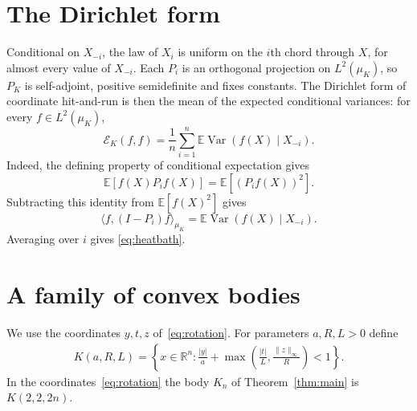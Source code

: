 \documentclass[11pt]{amsart}
\theoremstyle{remark}
\numberwithin{equation}{section}
\newcommand{\E}{\mathbb E}
\newcommand{\R}{\mathbb R}
\newcommand{\Var}{\operatorname{Var}}
\begin{document}
\section{The Dirichlet form}\label{sec:operator}
Conditional on $X_{-i}$, the law of $X_i$ is uniform on the $i$th chord
through $X$, for almost every value of $X_{-i}$. Each $P_i$ is an orthogonal
projection on $L^2(\mu_K)$, so $P_K$ is self-adjoint, positive
semidefinite and fixes constants. The Dirichlet form of coordinate
hit-and-run is then the mean of the expected conditional variances: for
every $f\in L^2(\mu_K)$,
\begin{equation}\label{eq:heatbath}
 \mathcal E_K(f,f)=\frac1n\sum_{i=1}^n
 \E\Var(f(X)\mid X_{-i}).
\end{equation}
Indeed, the defining property of conditional expectation gives
\[
 \E[f(X)P_i f(X)]=\E[(P_i f(X))^2].
\]
Subtracting this identity from $\E[f(X)^2]$ gives
\[
 \langle f,(I-P_i)f\rangle_{\mu_K}
 =\E\Var(f(X)\mid X_{-i}).
\]
Averaging over $i$ gives \eqref{eq:heatbath}.

\section{A family of convex bodies}\label{sec:geometry}
We use the coordinates $y,t,z$ of~\eqref{eq:rotation}. For parameters $a,R,L>0$ define
\begin{equation}\label{eq:body}
 \begin{gathered}
 K(a,R,L)=\left\{x\in\R^n:
 \frac{|y|}{a}+\max\left(\frac{|t|}{L},\frac{\|z\|_\infty}{R}\right)<1
 \right\}.
 \end{gathered}
\end{equation}
In the coordinates~\eqref{eq:rotation} the body $K_n$ of Theorem~\ref{thm:main} is $K(2,2,2n)$.
\end{document}
